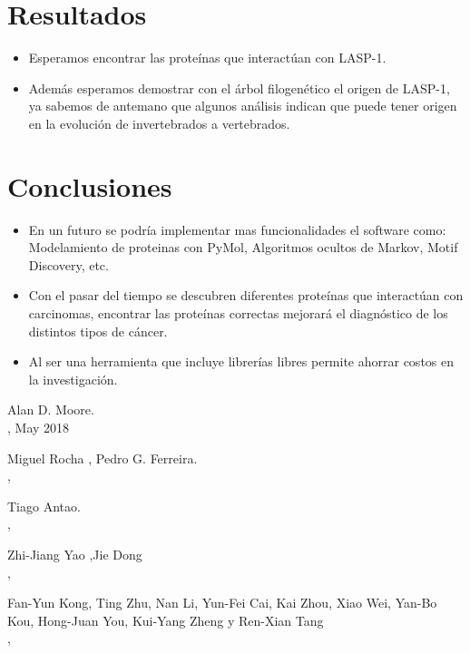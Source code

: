 \documentclass[twocolumn,twoside,11pt]{article}
\begin{document}
\normalsize
\section{Resultados}
\begin{itemize}
	
	\item  Esperamos encontrar las prote\'inas que interact\'uan con LASP-1.    
    
    \item Adem\'as esperamos demostrar con el \'arbol filogen\'etico el origen de LASP-1, ya sabemos de antemano que algunos an\'alisis indican que puede tener origen en la evoluci\'on de invertebrados a vertebrados.	
    
\end{itemize}

\section{Conclusiones}

\begin{itemize}
\item En un futuro se podr\'ia implementar mas funcionalidades el software como: Modelamiento de proteinas con PyMol, Algoritmos ocultos de Markov, Motif Discovery, etc.
\item Con el pasar del tiempo se descubren diferentes prote\'inas que interact\'uan con carcinomas, encontrar las prote\'inas correctas mejorar\'a el diagn\'ostico de los distintos tipos de c\'ancer.
\item Al ser una herramienta que incluye librer\'ias libres permite ahorrar costos en la investigaci\'on.  

\end{itemize}


\begin{thebibliography}{X}
	Alan D. Moore.\\
,
\newblock May 2018

    
	Miguel Rocha , Pedro G. Ferreira.\\
,
	
	
   Tiago Antao.\\
,

   Zhi-Jiang Yao ,Jie Dong\\
,

Fan-Yun Kong, Ting Zhu, Nan Li, Yun-Fei Cai, Kai Zhou, Xiao Wei, Yan-Bo Kou, Hong-Juan You, Kui-Yang Zheng y Ren-Xian Tang\\
,
	
\end{thebibliography}
\end{document}
